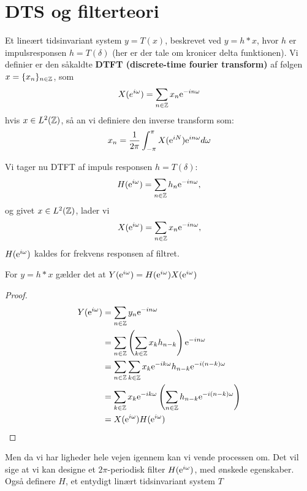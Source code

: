 \chapter{DTS og filterteori}
Et lineært tidsinvariant system $y = T(x)$, beskrevet ved $y = h * x$, hvor $h$ er impulsresponsen $h=T(\delta)$ (her er der tale om kronicer delta funktionen).
Vi definier er den såkaldte \textbf{DTFT (discrete-time fourier transform)} af følgen $x=\{x_{n}\}_{n \in \mathbb{Z} }$, som
\begin{equation*}
  X(e^{i\omega}) = \sum_{n \in \Z} x_{n} \e^{-i n \omega} %
\end{equation*}
hvis $x \in L^{2}(\mathbb{Z})$, så an vi definiere den inverse transform som:
\begin{equation*}
  x_{n} = \frac{1}{2\pi} \int_{-\pi}^{\pi} X(\mathrm{e}^{iN})\mathrm{e}^{in \omega} d\omega
\end{equation*}

Vi tager nu DTFT af impuls responsen $h = T(\delta)$:
\begin{equation*}
  H(\mathrm{e}^{i \omega}) = \sum_{n\in\mathbb{Z}} h_{n} \mathrm{e}^{-in \omega},
\end{equation*}
og givet $x \in L^{2}(\mathbb{Z})$, lader vi
\begin{equation*}
  X(\mathrm{e}^{i \omega}) = \sum_{n\in\mathbb{Z}} x_{n} \mathrm{e}^{-in \omega},
\end{equation*}
$H(\mathrm{e}^{i \omega})$ kaldes for frekvens responsen af filtret.

\begin{proposition}
  For $y = h * x$ gælder det at $Y(\mathrm{e}^{i \omega}) = H(\mathrm{e}^{i \omega}) X(\mathrm{e}^{i \omega})$
\end{proposition}
\begin{proof}
  \begin{align*}
    Y(\mathrm{e}^{i \omega}) &= \sum_{n\in\mathbb{Z}} y_{n} \mathrm{e}^{-in \omega} \\
                &= \sum_{n\in\mathbb{Z}} \left(\sum_{k\in\mathbb{Z}}x_{k}h_{n - k}\right)\mathrm{e}^{-in \omega} \\
                &= \sum_{n\in\mathbb{Z}} \sum_{k\in\mathbb{Z}}x_{k}\mathrm{e}^{-ik \omega}h_{n - k}\mathrm{e}^{-i(n - k) \omega} \\
                &=  \sum_{k\in\mathbb{Z}}x_{k}\mathrm{e}^{-ik \omega} \left(\sum_{n\in\mathbb{Z}} h_{n - k}\mathrm{e}^{-i(n - k) \omega}\right) \\
                &= X(\mathrm{e}^{i \omega})H(\mathrm{e}^{i \omega})
  \end{align*}
\end{proof}
Men da vi har ligheder hele vejen igennem kan vi vende processen om. Det vil sige at vi kan designe et $2\pi$-periodisk filter $H(\mathrm{e}^{i \omega})$, med ønskede egenskaber. Også definere $H$, et entydigt linært tidsinvariant system $T$

